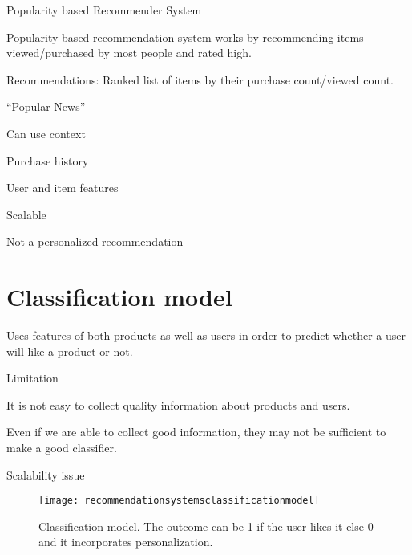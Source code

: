 Popularity based Recommender System
	\begin{bulletedlist}
		\item Popularity based recommendation system works by recommending items viewed/pur\-chased by most people and rated high.
		\item Recommendations: Ranked list of items by their purchase count/viewed count.
		\item``Popular News''
		\begin{bulletedlist}
			\item Can use context
			\item Purchase history
			\item User and item features
			\item Scalable
		\end{bulletedlist}
		\item Not a personalized recommendation
	\end{bulletedlist}

	\section{Classification model}
	\begin{bulletedlist}
		\item Uses features of both products as well as users in order to predict whether a user will like a product or not.
		\item Limitation
		\begin{numberedlist}
			\item It is not easy to collect quality information about products and users.
			\item Even if we are able to collect good information, they may not be sufficient to make a good classifier.
			\item Scalability issue
		\end{numberedlist}
	\end{bulletedlist}

	\begin{figure}[tbh]
		\centering
		\texttt{[image: recommendationsystemsclassificationmodel]}
		\caption[Classification model]{Classification model.  The outcome can be 1 if the user likes it else 0 and it incorporates personalization.}
		\label{fig:recommendationsystemsclassificationmodel}
	\end{figure}
 
